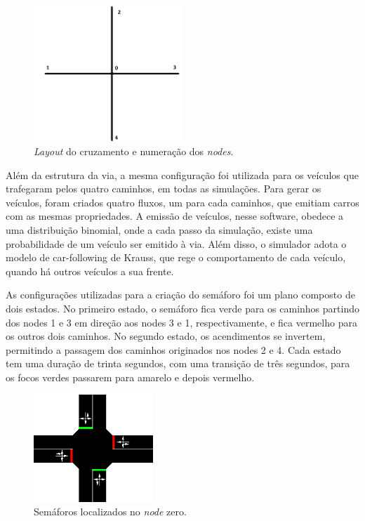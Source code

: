 \begin{figure}[ht]
    \begin{center}
    \includegraphics[width=0.5\textwidth]{figuras/Simulation_Scenario.png}
    \end{center}
    \caption[Estrutura da simulação]{\textit{Layout} do cruzamento e numeração dos \textit{nodes}.}
    \label{simulationLayout}
\end{figure}

Além da estrutura da via, a mesma configuração foi utilizada para os veículos que trafegaram pelos quatro caminhos, em todas as simulações. Para gerar os veículos, foram criados quatro fluxos, um para cada caminhos, que emitiam carros com as mesmas propriedades. A emissão de veículos, nesse software, obedece a uma distribuição binomial, onde a cada passo da simulação, existe uma probabilidade de um veículo ser emitido à via. Além disso, o simulador adota o modelo de car-following de Krauss, que rege o comportamento de cada veículo, quando há outros veículos a sua frente\cite{krauss}.

As configurações utilizadas para a criação do semáforo foi um plano composto de dois estados. No primeiro estado, o semáforo fica verde para os caminhos partindo dos nodes 1 e 3 em direção aos nodes 3 e 1, respectivamente, e fica vermelho para os outros dois caminhos. No segundo estado, os acendimentos se invertem, permitindo a passagem dos caminhos originados nos nodes 2 e 4. Cada estado tem uma duração de trinta segundos, com uma transição de três segundos, para os focos verdes passarem para amarelo e depois vermelho.

\begin{figure}[ht]
    \begin{center}
    \includegraphics[width=0.4\textwidth]{figuras/Traffic_Light.PNG}
    \end{center}
    \caption[Semáforo simulado]{Semáforos localizados no \textit{node} zero.}
    \label{TrafficLight}
\end{figure}


